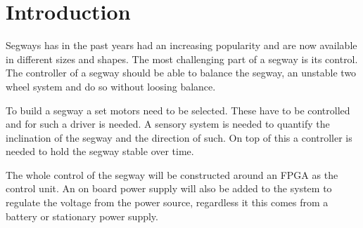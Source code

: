 
\section{Introduction}
Segways has in the past years had an increasing popularity and are now available in different sizes and shapes.
The most challenging part of a segway is its control.
The controller of a segway should be able to balance the segway, an unstable two wheel system and do so without loosing balance.

To build a segway a set motors need to be selected.
These have to be controlled and for such a driver is needed.
A sensory system is needed to quantify the inclination of the segway and the direction of such.
On top of this a controller is needed to hold the segway stable over time.

The whole control of the segway will be constructed around an FPGA as the control unit.
An on board power supply will also be added to the system to regulate the voltage from the power source, regardless it this comes from a battery or stationary power supply.